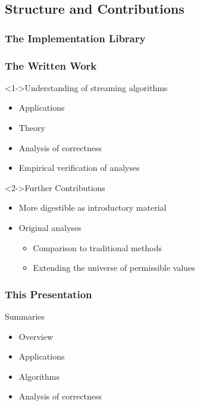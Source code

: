 \subsection{Structure and Contributions}

\begin{frame}
  \frametitle{The Implementation Library}

  \begin{adjustbox}{
    max height = \textheight,
    max width = \textwidth,
  }
    
  \end{adjustbox}
\end{frame}

\begin{frame}
  \frametitle{The Written Work}

  \begin{block}<1->{Understanding of streaming algorithms}
    \begin{itemize}
      \item Applications
      \item Theory
      \item Analysis of correctness
      \item Empirical verification of analyses
    \end{itemize}
  \end{block}

  \begin{block}<2->{Further Contributions}
    \begin{itemize}
      \item More digestible as introductory material
      \item Original analyses
      \begin{itemize}
        \item Comparison to traditional methods
        \item Extending the universe of permissible values
      \end{itemize}
    \end{itemize}
  \end{block}
\end{frame}

\begin{frame}
  \frametitle{This Presentation}

  \begin{block}{Summaries}
    \begin{itemize}
      \item Overview
      \item Applications
      \item Algorithms
      \item Analysis of correctness
    \end{itemize}
  \end{block}
\end{frame}
